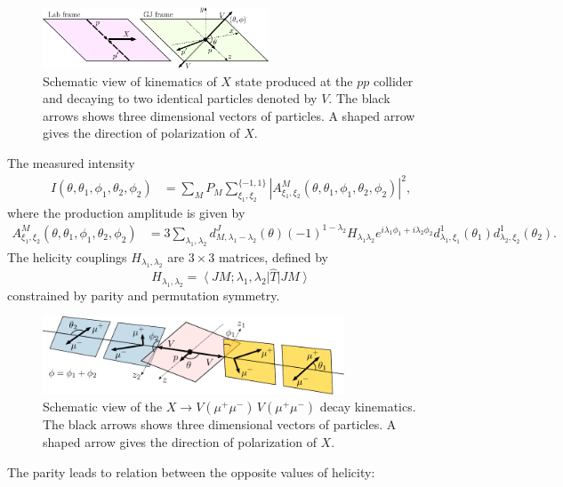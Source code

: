 \documentclass[prd,preprintnumbers,floatfix,
nofootinbib,superscriptaddress]{revtex4}
\newcommand{\ket}[1]{\ensuremath{\left|#1\right\rangle}}
\newcommand{\bra}[1]{\ensuremath{\left\langle #1\right|}}
\begin{document}
\begin{figure}
  \includegraphics[width=0.6\textwidth]{../plots/production_GJ.pdf}
  \caption{Schematic view of kinematics of $X$ state produced at the $pp$ collider and decaying to two identical particles denoted by $V$. The black arrows shows three dimensional vectors of particles. A shaped arrow gives the direction of polarization of $X$.
  }
  \label{fig:production}
\end{figure}
The measured intensity
\begin{align}
    I(\theta,\theta_1,\phi_1,\theta_2,\phi_2) &= \sum_{M}P_M
    \sum_{\xi_1,\xi_2}^{\{-1,1\}}
    \left|A^{M}_{\xi_1,\xi_2}(\theta,\theta_1,\phi_1,\theta_2,\phi_2)\right|^2,
\end{align}
where the production amplitude is given by
\begin{align}
  A^{M}_{\xi_1,\xi_2}(\theta,\theta_1,\phi_1,\theta_2,\phi_2) &= 3
  \sum_{\lambda_1,\lambda_2}
  d_{M,\lambda_1-\lambda_2}^{J}(\theta) (-1)^{1-\lambda_2}
  H_{\lambda_1\lambda_2}
  e^{i\lambda_1\phi_1+i\lambda_2\phi_2}
  d_{\lambda_1,\xi_1}^{1}(\theta_1) d_{\lambda_2,\xi_2}^{1}(\theta_2).
\end{align}
The helicity couplings $H_{\lambda_1,\lambda_2}$ are $3\times 3$ matrices,
defined by
\begin{equation}
  H_{\lambda_1,\lambda_2} = \bra{JM;\lambda_1,\lambda_2}\hat{T}\ket{JM}
\end{equation}
constrained by parity and permutation symmetry.
\begin{figure}
  \includegraphics[width=0.8\textwidth]{../plots/angles.pdf}
  \caption{Schematic view of the $X\to V(\mu^+\mu^-)\,V(\mu^+\mu^-)$ decay kinematics.
  The black arrows shows three dimensional vectors of particles. A shaped arrow gives the direction of polarization of $X$.}
  \label{fig:X.decay}
\end{figure}
The parity leads to relation between the opposite values of helicity:
\end{document}
